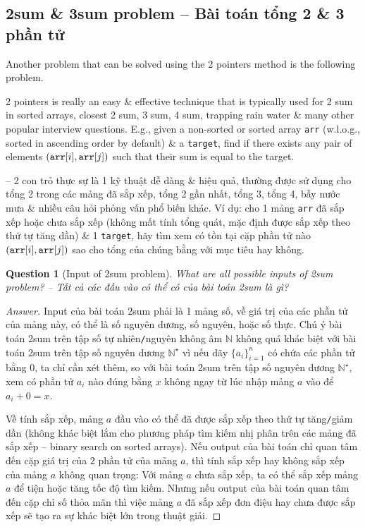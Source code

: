 \documentclass{article}
\newtheorem{question}{Question}
\begin{document}

\subsection{{\sc2sum} \& {\sc3sum} problem -- Bài toán tổng 2 \& 3 phần tử}
Another problem that can be solved using the 2 pointers method is the following {} problem.

2 pointers is really an easy \& effective technique that is typically used for 2 sum in sorted arrays, closest 2 sum, 3 sum, 4 sum, trapping rain water \& many other popular interview questions. E.g., given a non-sorted or sorted array {\tt arr} (w.l.o.g., sorted in ascending order by default) \& a {\tt target}, find if there exists any pair of elements $({\tt arr}[i],{\tt arr}[j])$ such that their sum is equal to the target.

-- 2 con trỏ thực sự là 1 kỹ thuật dễ dàng \& hiệu quả, thường được sử dụng cho tổng 2 trong các mảng đã sắp xếp, tổng 2 gần nhất, tổng 3, tổng 4, bẫy nước mưa \& nhiều câu hỏi phỏng vấn phổ biến khác. Ví dụ: cho 1 mảng {\tt arr} đã sắp xếp hoặc chưa sắp xếp (không mất tính tổng quát, mặc định được sắp xếp theo thứ tự tăng dần) \& 1 {\tt target}, hãy tìm xem có tồn tại cặp phần tử nào $({\tt arr}[i],{\tt arr}[j])$ sao cho tổng của chúng bằng với mục tiêu hay không.

\begin{question}[Input of {\sc2sum} problem]
    What are all possible inputs of {\sc2sum} problem? -- Tất cả các đầu vào có thể có của bài toán {\sc2sum} là gì?
\end{question}

\begin{proof}[Answer]
    Input của bài toán {\sc2sum} phải là 1 mảng số, về giá trị của các phần tử của mảng này, có thể là số nguyên dương, số nguyên, hoặc số thực. Chú ý bài toán {\sc2sum} trên tập số tự nhiên{\tt/}nguyên không âm $\mathbb{N}$ không quá khác biệt với bài toán {\sc2sum} trên tập số nguyên dương $\mathbb{N}^\star$ vì nếu dãy $\{a_i\}_{i=1}^n$ có chứa các phần tử bằng 0, ta chỉ cần xét thêm, so với bài toán {\sc2sum} trên tập số nguyên dương $\mathbb{N}^\star$, xem có phần tử $a_i$ nào đúng bằng $x$ không ngay từ lúc nhập mảng $a$ vào để $a_i + 0 = x$.

    Về tính sắp xếp, mảng $a$ đầu vào có thể đã được sắp xếp theo thứ tự tăng{\tt/}giảm dần (không khác biệt lắm cho phương pháp tìm kiếm nhị phân trên các mảng đã sắp xếp -- binary search on sorted arrays). Nếu output của bài toán chỉ quan tâm đến cặp giá trị của 2 phần tử của mảng $a$, thì tính sắp xếp hay không sắp xếp của mảng $a$ không quan trọng: Với mảng $a$ chưa sắp xếp, ta có thể sắp xếp mảng $a$ để tiện hoặc tăng tốc độ tìm kiếm. Nhưng nếu output của bài toán quan tâm đến cặp chỉ số thỏa mãn thì việc mảng $a$ đã sắp xếp đơn điệu hay chưa được sắp xếp sẽ tạo ra sự khác biệt lớn trong thuật giải.
\end{proof}
\end{document}
